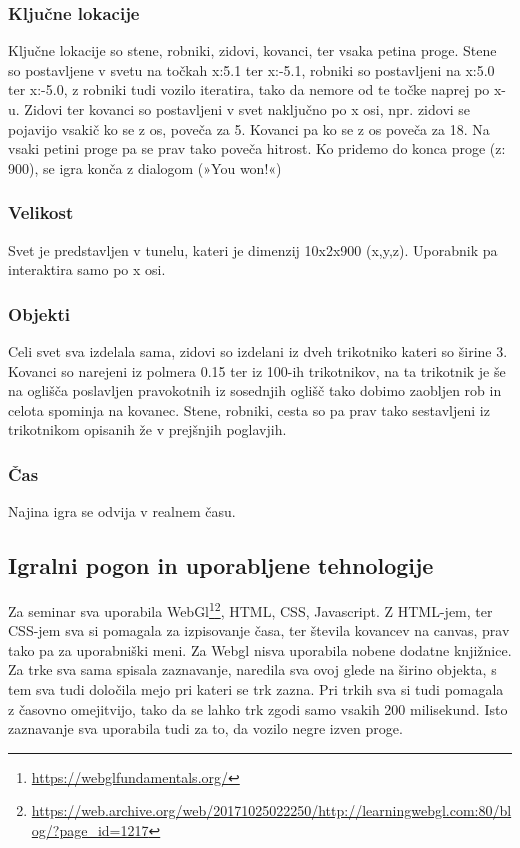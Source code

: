 \documentclass[a4paper]{article}
\begin{document}
\subsubsection{Ključne lokacije}
Ključne lokacije so stene, robniki, zidovi, kovanci, ter vsaka petina proge. Stene so postavljene v svetu na točkah x:5.1 ter x:-5.1, robniki so postavljeni na x:5.0 ter x:-5.0, z robniki tudi vozilo iteratira, tako da nemore od te točke naprej po x-u. Zidovi ter kovanci so postavljeni v svet naključno po x osi, npr. zidovi se pojavijo vsakič ko se z os, poveča za 5. Kovanci pa ko se z os poveča za 18. Na vsaki petini proge pa se prav tako poveča hitrost. Ko pridemo do konca proge (z: 900), se igra konča z dialogom (»You won!«)

\subsubsection{Velikost}
Svet je predstavljen v tunelu, kateri je dimenzij 10x2x900 (x,y,z). Uporabnik pa interaktira samo po x osi.

\subsubsection{Objekti}
Celi svet sva izdelala sama, zidovi so izdelani iz dveh trikotniko kateri so širine 3. Kovanci so narejeni iz polmera 0.15 ter iz 100-ih trikotnikov, na ta trikotnik je še na oglišča poslavljen pravokotnih iz sosednjih oglišč tako dobimo zaobljen rob in celota spominja na kovanec. Stene, robniki, cesta so pa prav tako sestavljeni iz trikotnikom opisanih že v prejšnjih poglavjih.
\subsubsection{Čas}
Najina igra se odvija v realnem času.

\subsection{Igralni pogon in uporabljene tehnologije}
Za seminar sva uporabila WebGl\footnote{\url{https://webglfundamentals.org/}}\footnote{\url{https://web.archive.org/web/20171025022250/http://learningwebgl.com:80/blog/?page_id=1217}}, HTML, CSS, Javascript. Z HTML-jem, ter CSS-jem sva si pomagala za izpisovanje časa, ter števila kovancev na canvas, prav tako pa za uporabniški meni. Za Webgl nisva uporabila nobene dodatne knjižnice. Za trke sva sama spisala zaznavanje, naredila sva ovoj glede na širino objekta, s tem sva tudi določila mejo pri kateri se trk zazna. Pri trkih sva si tudi pomagala z časovno omejitvijo, tako da se lahko trk zgodi samo vsakih 200 milisekund. Isto zaznavanje sva uporabila tudi za to, da vozilo negre izven proge.
\end{document}
